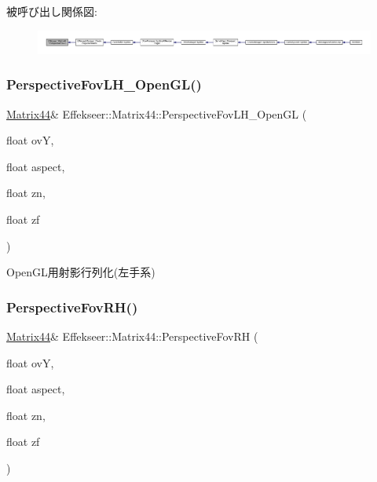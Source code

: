被呼び出し関係図\+:
\nopagebreak
\begin{figure}[H]
\begin{center}
\leavevmode
\includegraphics[width=350pt]{struct_effekseer_1_1_matrix44_a01facdf54829125dfefa4b1f29210c74_icgraph}
\end{center}
\end{figure}
\mbox{\label{struct_effekseer_1_1_matrix44_a6772f3ebb3a465742d6abde9a1e823ac}} 
\subsubsection{\texorpdfstring{Perspective\+Fov\+L\+H\+\_\+\+Open\+G\+L()}{PerspectiveFovLH\_OpenGL()}}
{\footnotesize\ttfamily \mbox{\hyperlink{struct_effekseer_1_1_matrix44}{Matrix44}}\& Effekseer\+::\+Matrix44\+::\+Perspective\+Fov\+L\+H\+\_\+\+Open\+GL (\begin{DoxyParamCaption}\item[{float}]{ovY,  }\item[{float}]{aspect,  }\item[{float}]{zn,  }\item[{float}]{zf }\end{DoxyParamCaption})}



Open\+G\+L用射影行列化(左手系) 

\mbox{\label{struct_effekseer_1_1_matrix44_a0deeef1c9ef11e08b34d72d8cc1907a1}} 
\subsubsection{\texorpdfstring{Perspective\+Fov\+R\+H()}{PerspectiveFovRH()}}
{\footnotesize\ttfamily \mbox{\hyperlink{struct_effekseer_1_1_matrix44}{Matrix44}}\& Effekseer\+::\+Matrix44\+::\+Perspective\+Fov\+RH (\begin{DoxyParamCaption}\item[{float}]{ovY,  }\item[{float}]{aspect,  }\item[{float}]{zn,  }\item[{float}]{zf }\end{DoxyParamCaption})}



